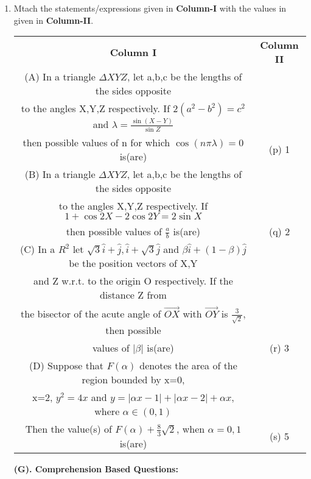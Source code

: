 \begin{enumerate}[label=\arabic*.,ref=\thesubsection.\theenumi]
\item Mtach the statements/expressions given in \textbf{Column-I} with the values in given in \textbf{Column-II}.
\begin{table}[ht!]
\centering
\begin{tabular}{c c} 
 \textbf{Column I} & \textbf{Column II}\\ [0.5ex] 
 (A) In a triangle $\Delta XYZ$, let a,b,c be the lengths of the sides opposite\\
     to the angles X,Y,Z respectively. If $2(a^2-b^2)=c^2$ and $\lambda=\frac{\sin(X-Y)}{\sin Z}$\\
     then possible values of n for which $\cos(n\pi\lambda)=0$ is(are)                              &(p) 1\\ 
 (B) In a triangle $\Delta XYZ$, let a,b,c be the lengths of the sides opposite\\
     to the angles X,Y,Z respectively. If $1+\cos2X-2\cos2Y=2\sin X$\\
     then possible values of $\frac{a}{b}$ is(are)                                                  &(q) 2\\
 (C) In a $R^2$ let $\sqrt{3}\hat{i}+\hat{j}, \hat{i}+\sqrt{3}\hat{j}$ and $\beta\hat{i}
     +(1-\beta)\hat{j}$ be the position vectors of X,Y\\ and Z w.r.t. to the origin O respectively.
     If the distance Z from\\ the bisector of the acute angle of $\overrightarrow{OX}$ with
     $\overrightarrow{OY}$ is $\frac{3}{\sqrt{2}}$, then possible\\ values of $|\beta|$ is(are)     &(r) 3\\
 (D) Suppose that $F(\alpha)$ denotes the area of the region bounded by x=0,\\
     x=2, $y^2=4x$ and $y=|\alpha x-1|+|\alpha x-2|+\alpha x$, where $\alpha \in (0,1)$\\
     Then the value(s) of $F(\alpha)+\frac{8}{3}\sqrt{2}$, when $\alpha =0, 1$ is(are)              &(s) 5\\[1ex]
                                                            
\end{tabular}
\end{table}
\clearpage

\textbf{(G). Comprehension Based Questions:}


\end{enumerate}
